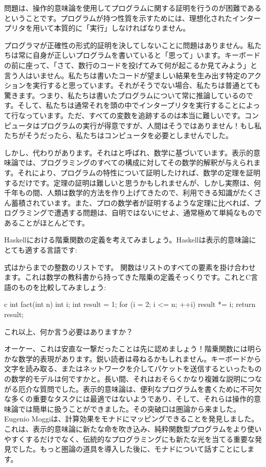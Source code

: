 問題は、操作的意味論を使用してプログラムに関する証明を行うのが困難であるということです。プログラムが持つ性質を示すためには、理想化されたインタープリタを用いて本質的に「実行」しなければなりません。

プログラマが正確性の形式的証明を決してしないことに問題はありません。私たちは常に自身が正しいプログラムを書いていると「思って」います。キーボードの前に座って、「さて、数行のコードを投げてみて何が起こるか見てみよう」と言う人はいません。私たちは書いたコードが望ましい結果を生み出す特定のアクションを実行すると思っています。それがそうでない場合、私たちは普通とても驚きます。つまり、私たちは書いたプログラムについて常に推論しているのです。そして、私たちは通常それを頭の中でインタープリタを実行することによって行なっています。ただ、すべての変数を追跡するのは本当に難しいです。コンピュータはプログラムの実行が得意ですが、人間はそうではありません！もし私たちがそうだったら、私たちはコンピュータを必要としませんでした。

しかし、代わりがあります。それはと呼ばれ、数学に基づいています。表示的意味論では、プログラミングのすべての構成に対してその数学的解釈が与えられます。それにより、プログラムの特性について証明したければ、数学の定理を証明するだけです。定理の証明は難しいと思うかもしれませんが、しかし実際は、何千年もの間、人類は数学的方法を作り上げてきたので、利用できる知識がたくさん蓄積されています。また、プロの数学者が証明するような定理に比べれば、プログラミングで遭遇する問題は、自明ではないにせよ、通常極めて単純なものであることがほとんどです。

Haskellにおける階乗関数の定義を考えてみましょう。Haskellは表示的意味論にとても適する言語です: 

式\code{{[}1..n{]}}はからまでの整数のリストです。
関数はリストのすべての要素を掛け合わせます。これは数学の教科書から持ってきた階乗の定義そっくりです。これとC言語のものを比較してみましょう: 

\begin{snip}{c}
int fact(int n) {
    int i;
    int result = 1;
    for (i = 2; i <= n; ++i)
        result *= i;
    return result;
}
\end{snip}
これ以上、何か言う必要はありますか？

オーケー、これは安直な一撃だったことは先に認めましょう！階乗関数には明らかな数学的表現があります。鋭い読者は尋ねるかもしれません。キーボードから文字を読み取る、またはネットワークを介してパケットを送信するといったものの数学的モデルは何ですかと。長い間、それはおそらくかなり複雑な説明につながる厄介な質問でした。表示的意味論は、便利なプログラムを書くために不可欠な多くの重要なタスクには最適ではないようであり、そして、それらは操作的意味論では簡単に扱うことができました。その突破口は圏論から来ました。
Eugenio Moggiは、計算効果をモナドにマッピングできることを発見しました。これは、表示的意味論に新たな命を吹き込み、純粋関数型プログラムをより使いやすくするだけでなく、伝統的なプログラミングにも新たな光を当てる重要な発見でした。もっと圏論の道具を導入した後に、モナドについて話すことにします。


